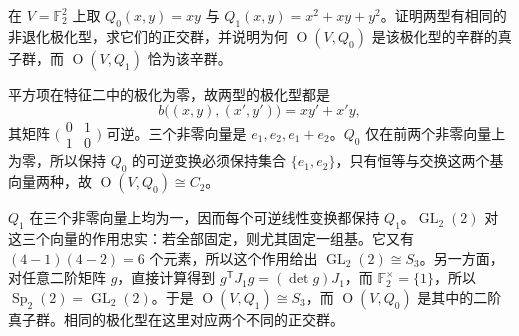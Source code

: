 \begin{exercise}\label{b5:ex:F-quadratic-two-forms}
	在 \(V=\mathbb F_2^2\) 上取 \(Q_0(x,y)=xy\) 与 \(Q_1(x,y)=x^2+xy+y^2\)。证明两型有相同的非退化极化型，求它们的正交群，并说明为何 \(\operatorname O(V,Q_0)\) 是该极化型的辛群的真子群，而 \(\operatorname O(V,Q_1)\) 恰为该辛群。
\end{exercise}
\begin{solution}
	平方项在特征二中的极化为零，故两型的极化型都是
	\[
		b\bigl((x,y),(x',y')\bigr)=xy'+x'y,
	\]
	其矩阵 \(\bigl(\begin{smallmatrix}0&1\\1&0\end{smallmatrix}\bigr)\) 可逆。三个非零向量是 \(e_1,e_2,e_1+e_2\)。\(Q_0\) 仅在前两个非零向量上为零，所以保持 \(Q_0\) 的可逆变换必须保持集合 \(\{e_1,e_2\}\)，只有恒等与交换这两个基向量两种，故 \(\operatorname O(V,Q_0)\cong C_2\)。

	\(Q_1\) 在三个非零向量上均为一，因而每个可逆线性变换都保持 \(Q_1\)。\(\operatorname{GL}_2(2)\) 对这三个向量的作用忠实：若全部固定，则尤其固定一组基。它又有 \((4-1)(4-2)=6\) 个元素，所以这个作用给出 \(\operatorname{GL}_2(2)\cong S_3\)。另一方面，对任意二阶矩阵 \(g\)，直接计算得到 \(g^{\mathsf T}J_1g=(\det g)J_1\)，而 \(\mathbb F_2^\times=\{1\}\)，所以 \(\operatorname{Sp}_2(2)=\operatorname{GL}_2(2)\)。于是 \(\operatorname O(V,Q_1)\cong S_3\)，而 \(\operatorname O(V,Q_0)\) 是其中的二阶真子群。相同的极化型在这里对应两个不同的正交群。
\end{solution}

